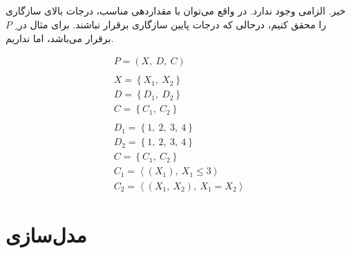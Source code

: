 \documentclass{article}
\begin{document}
\subsection{}
خیر. الزامی وجود ندارد. در واقع می‌توان با مقداردهی مناسب، درجات بالای سازگاری را محقق کنیم، درحالی که درجات پایین سازگاری برقرار نباشند. برای مثال در ِ $P$  برقرار می‌باشد، اما  نداریم. \\
\begin{fleqn}
\begin{equation}
\begin{aligned}
P = (X,\:D,\:C) \\ \\
X = \left\{ X_{1},\:X_{2} \right\} \\
D = \left\{ D_{1},\:D_{2} \right\} \\
C = \left\{ C_{1},\:C_{2} \right\} \\ \\
D_{1} = \left\{ 1,\:2,\:3,\:4 \right\} \\
D_{2} = \left\{ 1,\:2,\:3,\:4 \right\} \\
C = \left\{ C_{1},\:C_{2} \right\}\\
C_{1} = \left\langle \left( X_{1} \right),\: X_{1} \le 3 \right\rangle\\
C_{2} = \left\langle \left( X_{1},\: X_{2} \right),\: X_{1} = X_{2} \right\rangle
\end{aligned}
\end{equation}
\end{fleqn}
\subsection{}

\section{مدل‌سازی}
\end{document}
